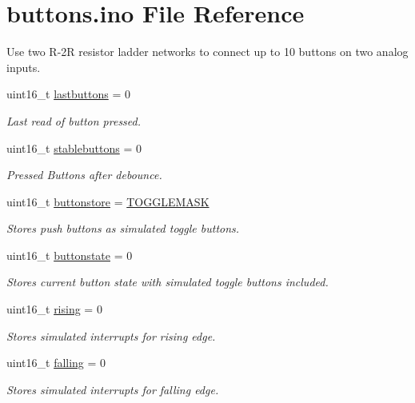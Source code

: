 \hypertarget{buttons_8ino}{}\section{buttons.\+ino File Reference}
\label{buttons_8ino}


Use two R-\/2R resistor ladder networks to connect up to 10 buttons on two analog inputs.  


\begin{DoxyCompactItemize}
\item 
uint16\+\_\+t \hyperlink{group__buttons_gac23a04180ca7609f571853499faae915}{lastbuttons} = 0
\begin{DoxyCompactList}\small\item\em Last read of button pressed. \end{DoxyCompactList}\item 
uint16\+\_\+t \hyperlink{group__buttons_gaca8bc953fb5340b58c9403b3bf8bbd8e}{stablebuttons} = 0
\begin{DoxyCompactList}\small\item\em Pressed Buttons after debounce. \end{DoxyCompactList}\item 
uint16\+\_\+t \hyperlink{group__buttons_gac52f8abe18e87b9ce8cdba2e27bbbf02}{buttonstore} = \hyperlink{group__buttons_ga77a6549a849f9a9472a367e4148289b7}{T\+O\+G\+G\+L\+E\+M\+A\+SK}
\begin{DoxyCompactList}\small\item\em Stores push buttons as simulated toggle buttons. \end{DoxyCompactList}\item 
uint16\+\_\+t \hyperlink{group__buttons_gafa19e52bd127439ef22ade9f91753386}{buttonstate} = 0
\begin{DoxyCompactList}\small\item\em Stores current button state with simulated toggle buttons included. \end{DoxyCompactList}\item 
uint16\+\_\+t \hyperlink{group__buttons_gacc4c256fa5e75c09f1b3a669d45485ec}{rising} = 0
\begin{DoxyCompactList}\small\item\em Stores simulated interrupts for rising edge. \end{DoxyCompactList}\item 
uint16\+\_\+t \hyperlink{group__buttons_ga1861b594f36400f6c17b1f65b2565816}{falling} = 0
\begin{DoxyCompactList}\small\item\em Stores simulated interrupts for falling edge. \end{DoxyCompactList}\item 

\end{DoxyCompactItemize}
